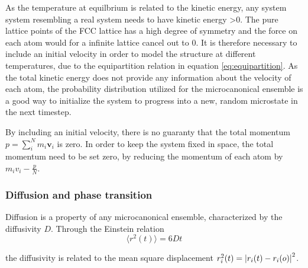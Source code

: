 As the temperature at equilbrium is related to the kinetic energy, any system system resembling a real system needs to have kinetic energy >0. The pure lattice points of the FCC lattice has a high degree of symmetry and the force on each atom would for a infinite lattice cancel out to 0. It is therefore necessary to include an initial velocity in order to model the structure at different temperatures, due to the equipartition relation in equation \ref{eq:equipartition}. As the total kinetic energy does not provide any information about the velocity of each atom, the probability distribution utilized for the microcanonical ensemble is a good way to initialize the system to progress into a new, random microstate in the next timestep. 

By including an initial velocity, there is no guaranty that the total momentum $ p = \sum\limits_{i}^{N} m_i\textbf{v}_i $ is zero. In order to keep the system fixed in space, the total momentum need to be set zero, by reducing the momentum of each atom by $ m_iv_i - \frac{p}{N}$. 

\subsubsection{Diffusion and phase transition}
Diffusion is a property of any microcanonical ensemble, characterized by the diffusivity $ D $. Through the Einstein relation
\begin{equation}\label{eq:Einstein}
\langle r^2(t) \rangle = 6Dt
\end{equation}

the diffusivity is related to the mean square displacement $ r_i^2(t) = \abs{r_i(t) - r_i(o)}^2 $. 
